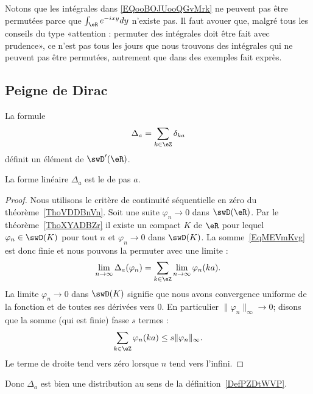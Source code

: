 \begin{normaltext}
	Notons que les intégrales dans \eqref{EQooBOJUooQGvMrk} ne peuvent pas être permutées parce que \( \int_{\eR} e^{-ixy}dy\) n'existe pas. Il faut avouer que, malgré tous les conseils du type «attention : permuter des intégrales doit être fait avec prudence», ce n'est pas tous les jours que nous trouvons des intégrales qui ne peuvent pas être permutées, autrement que dans des exemples fait exprès.
\end{normaltext}

\subsection{Peigne de Dirac}

\begin{proposition}
	La formule
	\begin{equation}    \label{EqMEVmKvg}
		\Delta_a=\sum_{k\in \eZ}\delta_{ka}
	\end{equation}
	définit un élément de \( \swD'(\eR)\).
\end{proposition}
La forme linéaire \( \Delta_a\) est le  de pas \( a\).

\begin{proof}
	Nous utilisons le critère de continuité séquentielle en zéro du théorème~\ref{ThoVDDBnVn}. Soit une suite \( \varphi_n\to 0\) dans \( \swD(\eR)\). Par le théorème~\ref{ThoXYADBZr} il existe un compact \( K\) de \( \eR\) pour lequel \( \varphi_n\in\swD(K)\) pour tout \( n\) et \( \varphi_n\to0\) dans \( \swD(K)\). La somme~\ref{EqMEVmKvg} est donc finie et nous pouvons la permuter avec une limite :
	\begin{equation}
		\lim_{n\to \infty} \Delta_a(\varphi_n)=\sum_{k\in\eZ}\lim_{n\to \infty} \varphi_n(ka).
	\end{equation}
	La limite \( \varphi_n\to 0\) dans \( \swD(K)\) signifie que nous avons convergence uniforme de la fonction et de toutes ses dérivées vers \( 0\). En particulier \( \| \varphi_n \|_{\infty}\to 0\); disons que la somme (qui est finie) fasse \( s\) termes :
	\begin{equation}
		\sum_{k\in \eZ}\varphi_n(ka)\leq s\| \varphi_n \|_{\infty}.
	\end{equation}
	Le terme de droite tend vers zéro lorsque \( n\) tend vers l'infini.
\end{proof}
Donc \( \Delta_a\) est bien une distribution au sens de la définition~\ref{DefPZDtWVP}.

